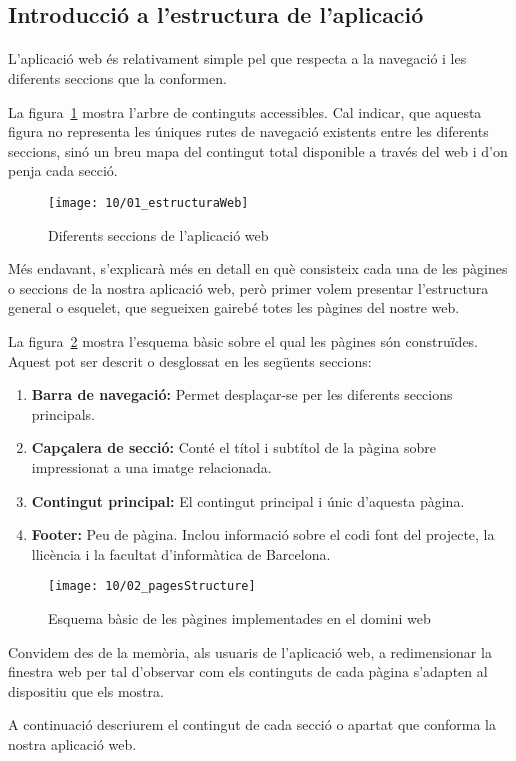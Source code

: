 \subsection{Introducció a l'estructura de l'aplicació}

    \paragraph{}
    L'aplicació web és relativament simple pel que respecta a la navegació i les diferents seccions que la conformen.

    La figura~\ref{fig:webStructure} mostra l'arbre de continguts accessibles. Cal indicar, que aquesta figura no representa les úniques rutes de navegació existents entre les diferents seccions, sinó un breu mapa del contingut total disponible a través del web i d’on penja cada secció.

    \begin{figure}[h]
        \texttt{[image: 10/01\_estructuraWeb]}
        \centering
        \caption{Diferents seccions de l'aplicació web}\label{fig:webStructure}
    \end{figure}

    Més endavant, s’explicarà més en detall en què consisteix cada una de les pàgines o seccions de la nostra aplicació web, però primer volem presentar l'estructura general o esquelet, que segueixen gairebé totes les pàgines del nostre web.

    La figura~\ref{fig:pageStructure} mostra l'esquema bàsic sobre el qual les pàgines són construïdes. Aquest pot ser descrit o desglossat en les següents seccions:

    \begin{enumerate}
        \item \textbf{Barra de navegació:} Permet desplaçar-se per les diferents seccions principals.
        \item \textbf{Capçalera de secció:} Conté el títol i subtítol de la pàgina sobre impressionat a una imatge relacionada.
        \item \textbf{Contingut principal:} El contingut principal i únic d'aquesta pàgina.
        \item \textbf{Footer:} Peu de pàgina. Inclou informació sobre el codi font del projecte, la llicència i la facultat d'informàtica de Barcelona.
    \end{enumerate}

    \begin{figure}[h]
        \texttt{[image: 10/02\_pagesStructure]}
        \centering
        \caption{Esquema bàsic de les pàgines implementades en el domini web}\label{fig:pageStructure}
    \end{figure}

    Convidem des de la memòria, als usuaris de l'aplicació web, a redimensionar la finestra web per tal d'observar com els continguts de cada pàgina s’adapten al dispositiu que els mostra.

    A continuació descriurem el contingut de cada secció o apartat que conforma la nostra aplicació web.
